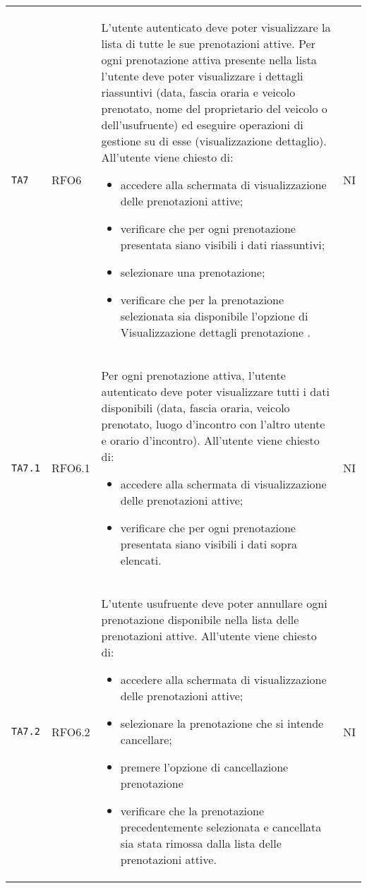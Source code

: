 \begin{longtable}{ >{\centering}p{} >{\centering}p{} >{\centering}p{}
			>{\centering}p{}}
		 
		  \texttt{TA7} & RFO6  & L'utente autenticato deve poter visualizzare la lista di tutte le sue prenotazioni attive.
		 Per ogni prenotazione attiva presente nella lista l'utente deve poter visualizzare i dettagli riassuntivi (data, fascia oraria e veicolo prenotato, nome del proprietario del veicolo o dell'usufruente) ed eseguire operazioni di gestione su di esse (visualizzazione dettaglio). All'utente viene chiesto di:
		 \begin{itemize}
		 	\item accedere alla schermata di visualizzazione delle prenotazioni attive;
		 	\item verificare che per ogni prenotazione presentata siano visibili i dati riassuntivi;
		 	\item selezionare una prenotazione;
		 	\item verificare che per la prenotazione selezionata sia disponibile l'opzione di Visualizzazione dettagli prenotazione .
		 \end{itemize} & NI	\tabularnewline
		 	\texttt{TA7.1} & RFO6.1 &	Per ogni prenotazione attiva, l'utente autenticato deve poter visualizzare tutti i dati disponibili (data, fascia oraria, veicolo prenotato, luogo d'incontro con l'altro utente e orario d'incontro). All'utente viene chiesto di:
		 \begin{itemize}
		 	\item accedere alla schermata di visualizzazione delle prenotazioni attive;
		 	\item verificare che per ogni prenotazione presentata siano visibili i dati sopra elencati.
		 \end{itemize}	&	NI	\tabularnewline
		 \texttt{TA7.2} & RFO6.2 &	L'utente usufruente deve poter annullare ogni prenotazione disponibile nella lista delle prenotazioni attive. All'utente viene chiesto di:
		 \begin{itemize}
		 	\item accedere alla schermata di visualizzazione delle prenotazioni attive;
		 	\item selezionare la prenotazione che si intende cancellare;
		 	\item premere l'opzione di cancellazione prenotazione
		 	\item verificare che la prenotazione precedentemente selezionata e cancellata sia stata rimossa dalla lista delle prenotazioni attive.
		 \end{itemize}	&	NI	\tabularnewline
		

\end{longtable}
